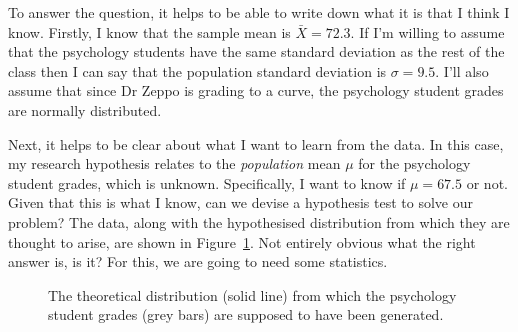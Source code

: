 To answer the question, it helps to be able to write down what it is that I think I know. Firstly, I know that the sample mean is $\bar{X} = 72.3$. If I'm willing to assume that the psychology students have the same standard deviation as the rest of the class then I can say that the population standard deviation is $\sigma = 9.5$. I'll also assume that since Dr Zeppo is grading to a curve, the psychology student grades are normally distributed. 

Next, it helps to be clear about what I want to learn from the data. In this case, my research hypothesis relates to the {\it population} mean $\mu$ for the psychology student grades, which is unknown. Specifically, I want to know if $\mu = 67.5$ or not. Given that this is what I know, can we devise a hypothesis test to solve our problem? The data, along with the hypothesised distribution from which they are thought to arise, are shown in Figure~\ref{fig:zeppo}. Not entirely obvious what the right answer is, is it? For this, we are going to need some statistics.
\begin{figure}
\begin{center}
\caption{The theoretical distribution (solid line) from which the psychology student grades (grey bars) are supposed to have been generated.}
\HR
\label{fig:zeppo}
\end{center}
\end{figure}



